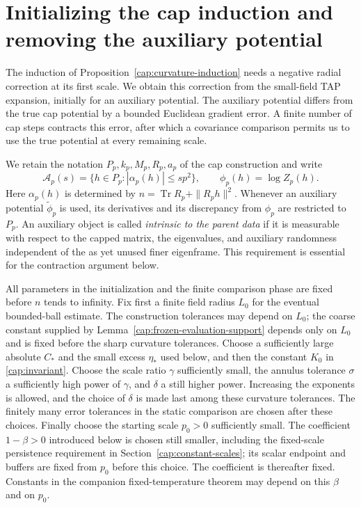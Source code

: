 \section[Initializing the cap induction and removing the auxiliary potential]{Initializing the cap induction and\\removing the auxiliary potential}
\label{cap:initialization}

The induction of Proposition~\ref{cap:curvature-induction} needs a negative
radial correction at its first scale. We obtain this correction from the
small-field TAP expansion, initially for an auxiliary potential. The auxiliary
potential differs from the true cap potential by a bounded Euclidean gradient
error. A finite number of cap steps contracts this error, after which a
covariance comparison permits us to use the true potential at every remaining
scale.

We retain the notation $P_p,k_p,M_p,R_p,a_p$ of the cap construction and
write
\[
 \mathcal A_p(s)=\{h\in P_p:|\alpha_p(h)|\le s p^2\},
 \qquad \phi_p(h)=\log Z_p(h).
\]
Here $\alpha_p(h)$ is determined by $n=\operatorname{Tr}R_p+\|R_ph\|^2$.
Whenever an auxiliary potential $\widetilde\phi_p$ is used, its derivatives
and its discrepancy from $\phi_p$ are restricted to $P_p$. An auxiliary object
is called \emph{intrinsic to the parent data} if it is measurable with respect
to the capped matrix, the eigenvalues, and auxiliary randomness independent of
the as yet unused finer eigenframe. This requirement is essential for the
contraction argument below.

All parameters in the initialization and the finite comparison phase are fixed
before $n$ tends to infinity. Fix first a finite field radius $L_0$ for the
eventual bounded-ball estimate. The construction tolerances may depend on
$L_0$; the coarse constant supplied by
Lemma~\ref{cap:frozen-evaluation-support} depends only on $L_0$ and is
fixed before the sharp curvature tolerances. Choose a sufficiently large absolute $C_*$
and the small excess $\eta_*$ used below, and then the constant $K_0$ in
\eqref{cap:invariant}. Choose the scale ratio
$\gamma$ sufficiently small, the annulus tolerance $\sigma$ a sufficiently
high power of $\gamma$, and $\delta$ a still higher power. Increasing the
exponents is allowed, and the choice of $\delta$ is made last among these
curvature tolerances. The finitely many error tolerances in the static
comparison are chosen after these choices. Finally choose the starting scale
$p_0>0$ sufficiently small. The coefficient $1-\beta>0$ introduced below is
chosen still smaller, including the fixed-scale persistence requirement in
Section~\ref{cap:constant-scales}; its scalar endpoint and buffers are fixed
from $p_0$ before this choice. The coefficient is thereafter fixed. Constants in the companion
fixed-temperature theorem may depend on this $\beta$ and on $p_0$.

